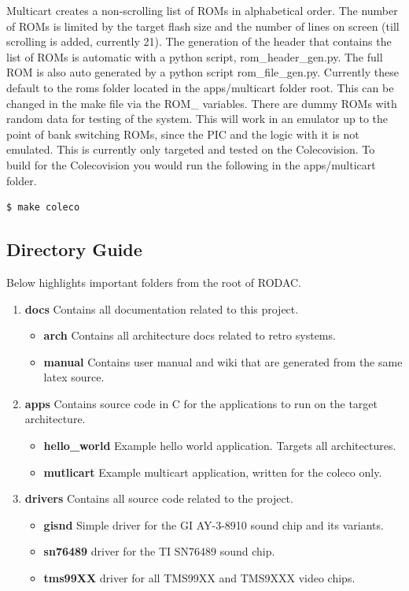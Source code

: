 \par
Multicart creates a non-scrolling list of ROMs in alphabetical order. The number of ROMs is limited by the target flash size and the number of
lines on screen (till scrolling is added, currently 21). The generation of the header that contains the list of ROMs is automatic with a python
script, rom\_header\_gen.py. The full ROM is also auto generated by a python script rom\_file\_gen.py. Currently these default to the roms folder
located in the apps/multicart folder root. This can be changed in the make file via the ROM\_\* variables. There are dummy ROMs with random data
for testing of the system. This will work in an emulator up to the point of bank switching ROMs, since the PIC and the logic with it is not emulated.
This is currently only targeted and tested on the Colecovision. To build for the Colecovision you would run the following in the apps/multicart folder.

\begin{lstlisting}[language=bash]
  $ make coleco
\end{lstlisting}

\subsection{Directory Guide}

\par
Below highlights important folders from the root of RODAC.

\begin{enumerate}
  \item \textbf{docs} Contains all documentation related to this project.
    \begin{itemize}
      \item \textbf{arch} Contains all architecture docs related to retro systems.
      \item \textbf{manual} Contains user manual and wiki that are generated from the same latex source.
    \end{itemize}
  \item \textbf{apps} Contains source code in C for the applications to run on the target architecture.
    \begin{itemize}
      \item \textbf{hello\_world} Example hello world application. Targets all architectures.
      \item \textbf{mutlicart} Example multicart application, written for the coleco only.
    \end{itemize}
  \item \textbf{drivers} Contains all source code related to the project.
    \begin{itemize}
      \item \textbf{gisnd} Simple driver for the GI AY-3-8910 sound chip and its variants.
      \item \textbf{sn76489} driver for the TI SN76489 sound chip.
      \item \textbf{tms99XX} driver for all TMS99XX and TMS9XXX video chips.
    \end{itemize}
\end{enumerate}

